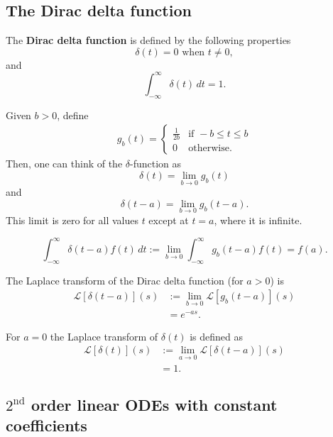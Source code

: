 \documentclass[12pt, a4paper]{article}
\newcommand{\CL}{\mathcal{L}}
\begin{document}
\subsection{The Dirac delta function}

\begin{definition}
    The \textbf{Dirac delta function} is defined by the following properties
    \[\delta(t) = 0 \text{ when } t \neq 0,\]
    and 
    \[\int_{-\infty}^{\infty} \delta(t) \, dt =1.\]
\end{definition}

Given \(b>0\), define 
\[\begin{aligned}
    g_b(t) = \begin{cases}
        \frac{1}{2b} &\text{if } -b \leq t \leq b \\
        0 &\text{otherwise}.
    \end{cases}
\end{aligned}\]
Then, one can think of the \(\delta\)-function as
\[\delta(t) = \lim_{b \to 0} g_b(t)\]
and 
\[\delta(t-a) = \lim_{b \to 0} g_b(t-a).\]
This limit is zero for all values \(t\) except at \(t=a\), where it is infinite.

\begin{theorem}
    \[\int_{-\infty}^{\infty} \delta(t-a)f(t) \, dt := \lim_{b\to 0} \int_{-\infty}^{\infty} g_b(t-a)f(t) = f(a).\]
\end{theorem}

\begin{mdthm}
    The Laplace transform of the Dirac delta function (for \(a>0\)) is 
    \[\begin{aligned}
        \CL[\delta(t-a)](s) &:= \lim_{b \to 0} \CL[g_b(t-a)](s) \\
        &= e^{-as}.
    \end{aligned}\]
\end{mdthm}

\begin{mdcor}
    For \(a=0\) the Laplace transform of \(\delta(t)\) is defined as 
    \[\begin{aligned}
        \CL[\delta(t)](s) &:= \lim_{a \to 0} \CL[\delta(t-a)](s) \\
        &=1.
    \end{aligned}\]
\end{mdcor}

\subsection{\texorpdfstring{\(2^{\text{nd}}\)}{TEXT} order linear ODEs with constant coefficients}
\end{document}
